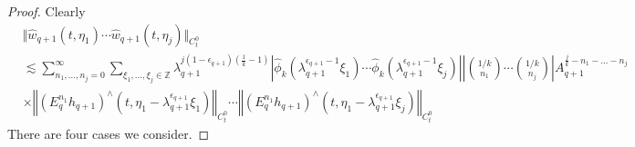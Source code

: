\documentclass[12pt,reqno,letterpaper]{amsart}
\numberwithin{equation}{section}
\newcommand{\1}{{\bf 1}}
\newcommand{\2}{{\bf 2}}
\newcommand{\Z}{\mathbb Z}
\theoremstyle{remark}
\theoremstyle{remark}
\begin{document}
\begin{proof}
    Clearly
    \begin{equation*}
        \begin{split}
            &\Vert \hat{w}_{q+1}(t,\eta_1) \cdots \hat{w}_{q+1}(t,\eta_j) \Vert_{C_t^0}\\
            &\lesssim \sum_{n_1,\ldots,n_j = 0}^\infty \sum_{\xi_1, \ldots,\xi_j \in \Z} \lambda_{q+1}^{j(1-\epsilon_{q+1})\left(\frac{1}{k}-1\right)} \left|\hat{\phi}_k\left(\lambda_{q+1}^{\epsilon_{q+1}-1}\xi_1\right) \cdots \hat{\phi}_k\left(\lambda_{q+1}^{\epsilon_{q+1}-1}\xi_j\right)\right| \left|\binom{1/k}{n_1} \cdots \binom{1/k}{n_j}\right| A_{q+1}^{\frac{j}{k}-n_1 -\ldots - n_j}\\
            &\times \left\Vert \left(E_q^{n_1} h_{q+1}\right)^{\wedge}(t,\eta_1 - \lambda_{q+1}^{\epsilon_{q+1}} \xi_1) \right\Vert_{C_t^0} \cdots \left\Vert \left(E_q^{n_1} h_{q+1}\right)^{\wedge}(t,\eta_1 - \lambda_{q+1}^{\epsilon_{q+1}} \xi_j) \right\Vert_{C_t^0}
        \end{split}
    \end{equation*}
    There are four cases we consider.


\end{proof}
\end{document}
